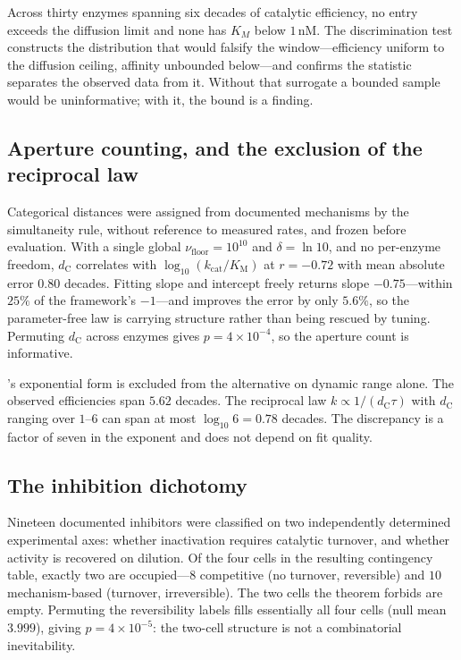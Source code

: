 \documentclass[11pt,twocolumn,a4paper]{article}
\theoremstyle{plain}
\theoremstyle{definition}
\theoremstyle{remark}
\newcommand{\dC}{d_{\mathrm{C}}}
\newcommand{\nufloor}{\nu_{\mathrm{floor}}}
\newcommand{\kcat}{k_{\mathrm{cat}}}
\newcommand{\KM}{K_{\mathrm{M}}}
\begin{document}
Across thirty enzymes spanning six decades of catalytic efficiency, no entry
exceeds the diffusion limit and none has $K_M$ below $1$\,nM. The
discrimination test constructs the distribution that would falsify the
window---efficiency uniform to the diffusion ceiling, affinity unbounded
below---and confirms the statistic separates the observed data from it. Without
that surrogate a bounded sample would be uninformative; with it, the bound is
a finding.

\subsection{Aperture counting, and the exclusion of the reciprocal law}

Categorical distances were assigned from documented mechanisms by the
simultaneity rule, without reference to measured rates, and frozen before
evaluation. With a single global $\nufloor = 10^{10}$ and $\delta = \ln 10$,
and no per-enzyme freedom, $\dC$ correlates with $\log_{10}(\kcat/\KM)$ at
$r = -0.72$ with mean absolute error $0.80$ decades. Fitting slope and
intercept freely returns slope $-0.75$---within $25\%$ of the framework's
$-1$---and improves the error by only $5.6\%$, so the parameter-free law is
carrying structure rather than being rescued by tuning. Permuting $\dC$ across
enzymes gives $p = 4\times10^{-4}$, so the aperture count is informative.

's exponential form is excluded from the alternative on
dynamic range alone. The observed efficiencies span $5.62$ decades. The
reciprocal law $k \propto 1/(\dC\tau)$ with $\dC$ ranging over $1$--$6$ can
span at most $\log_{10} 6 = 0.78$ decades. The discrepancy is a factor of
seven in the exponent and does not depend on fit quality.

\subsection{The inhibition dichotomy}

Nineteen documented inhibitors were classified on two independently determined
experimental axes: whether inactivation requires catalytic turnover, and
whether activity is recovered on dilution. Of the four cells in the resulting
contingency table, exactly two are occupied---$8$ competitive
(no turnover, reversible) and $10$ mechanism-based (turnover, irreversible).
The two cells the theorem forbids are empty. Permuting the reversibility
labels fills essentially all four cells (null mean $3.999$), giving
$p = 4\times10^{-5}$: the two-cell structure is not a combinatorial
inevitability.
\end{document}
